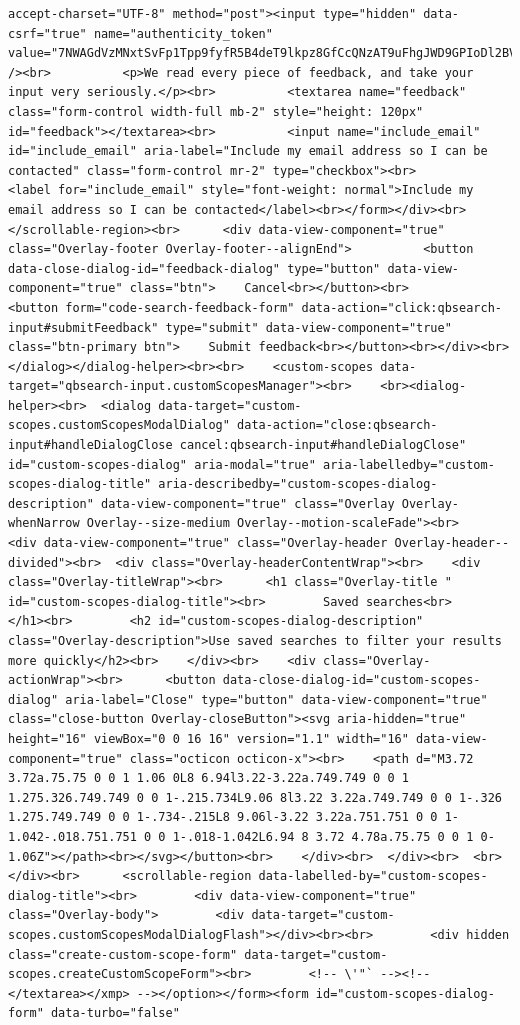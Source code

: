 \documentclass[
  letterpaper,
]{book}
\begin{document}
\begin{verbatim}
accept-charset="UTF-8" method="post"><input type="hidden" data-csrf="true" name="authenticity_token" value="7NWAGdVzMNxtSvFp1Tpp9fyfR5B4deT9lkpz8GfCcQNzAT9uFhgJWD9GPIoDl2BVZpl2YtW3seQLscSjkd2P0w==" /><br>          <p>We read every piece of feedback, and take your input very seriously.</p><br>          <textarea name="feedback" class="form-control width-full mb-2" style="height: 120px" id="feedback"></textarea><br>          <input name="include_email" id="include_email" aria-label="Include my email address so I can be contacted" class="form-control mr-2" type="checkbox"><br>          <label for="include_email" style="font-weight: normal">Include my email address so I can be contacted</label><br></form></div><br>      </scrollable-region><br>      <div data-view-component="true" class="Overlay-footer Overlay-footer--alignEnd">          <button data-close-dialog-id="feedback-dialog" type="button" data-view-component="true" class="btn">    Cancel<br></button><br>          <button form="code-search-feedback-form" data-action="click:qbsearch-input#submitFeedback" type="submit" data-view-component="true" class="btn-primary btn">    Submit feedback<br></button><br></div><br></dialog></dialog-helper><br><br>    <custom-scopes data-target="qbsearch-input.customScopesManager"><br>    <br><dialog-helper><br>  <dialog data-target="custom-scopes.customScopesModalDialog" data-action="close:qbsearch-input#handleDialogClose cancel:qbsearch-input#handleDialogClose" id="custom-scopes-dialog" aria-modal="true" aria-labelledby="custom-scopes-dialog-title" aria-describedby="custom-scopes-dialog-description" data-view-component="true" class="Overlay Overlay-whenNarrow Overlay--size-medium Overlay--motion-scaleFade"><br>    <div data-view-component="true" class="Overlay-header Overlay-header--divided"><br>  <div class="Overlay-headerContentWrap"><br>    <div class="Overlay-titleWrap"><br>      <h1 class="Overlay-title " id="custom-scopes-dialog-title"><br>        Saved searches<br>      </h1><br>        <h2 id="custom-scopes-dialog-description" class="Overlay-description">Use saved searches to filter your results more quickly</h2><br>    </div><br>    <div class="Overlay-actionWrap"><br>      <button data-close-dialog-id="custom-scopes-dialog" aria-label="Close" type="button" data-view-component="true" class="close-button Overlay-closeButton"><svg aria-hidden="true" height="16" viewBox="0 0 16 16" version="1.1" width="16" data-view-component="true" class="octicon octicon-x"><br>    <path d="M3.72 3.72a.75.75 0 0 1 1.06 0L8 6.94l3.22-3.22a.749.749 0 0 1 1.275.326.749.749 0 0 1-.215.734L9.06 8l3.22 3.22a.749.749 0 0 1-.326 1.275.749.749 0 0 1-.734-.215L8 9.06l-3.22 3.22a.751.751 0 0 1-1.042-.018.751.751 0 0 1-.018-1.042L6.94 8 3.72 4.78a.75.75 0 0 1 0-1.06Z"></path><br></svg></button><br>    </div><br>  </div><br>  <br></div><br>      <scrollable-region data-labelled-by="custom-scopes-dialog-title"><br>        <div data-view-component="true" class="Overlay-body">        <div data-target="custom-scopes.customScopesModalDialogFlash"></div><br><br>        <div hidden class="create-custom-scope-form" data-target="custom-scopes.createCustomScopeForm"><br>        <!-- \'"` --><!-- </textarea></xmp> --></option></form><form id="custom-scopes-dialog-form" data-turbo="false" 
\end{verbatim}
\end{document}
